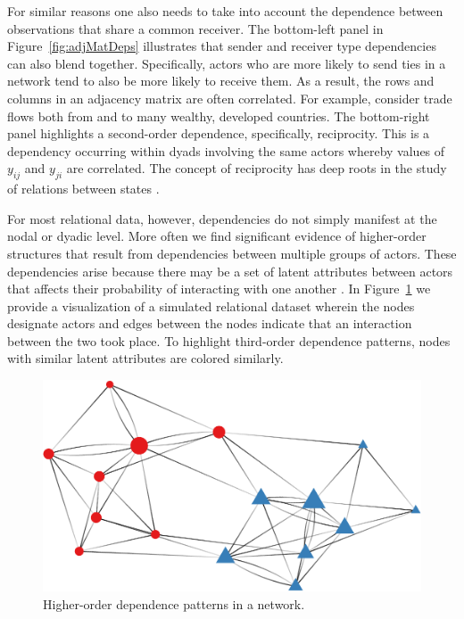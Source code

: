\documentclass[12pt]{amsart}
\begin{document}
For similar reasons one also needs to take into account the dependence between observations that share a common receiver. The bottom-left panel in Figure~\ref{fig:adjMatDeps} illustrates that sender and receiver type dependencies can also blend together. Specifically, actors who are more likely to send ties in a network tend to also be more likely to receive them. As a result, the rows and columns in an adjacency matrix are often correlated. For example, consider trade flows both from and to many wealthy, developed countries. The bottom-right panel highlights a second-order dependence, specifically, reciprocity. This is a dependency occurring within dyads involving the same actors whereby values of $y_{ij}$ and $y_{ji}$ are correlated. The concept of reciprocity has deep roots in the study of relations between states \citep{richardson:1960,keohane:1989}.

For most relational data, however, dependencies do not simply manifest at the nodal or dyadic level. More often we find significant evidence of higher-order structures that result from dependencies between multiple groups of actors. These dependencies arise because there may be a set of latent attributes between actors that affects their probability of interacting with one another \citep{zinnes:1967,wasserman:faust:1994}. In Figure~\ref{fig:thirdDeps} we provide a visualization of a simulated relational dataset wherein the nodes designate actors and edges between the nodes indicate that an interaction between the two took place. To highlight third-order dependence patterns, nodes with similar latent attributes are colored similarly.

\begin{figure}[ht]
	\includegraphics[width=.6\textwidth]{stochEquiv_v2.pdf}
	\caption{Higher-order dependence patterns in a network.}
	\label{fig:thirdDeps}
\end{figure}
\end{document}
